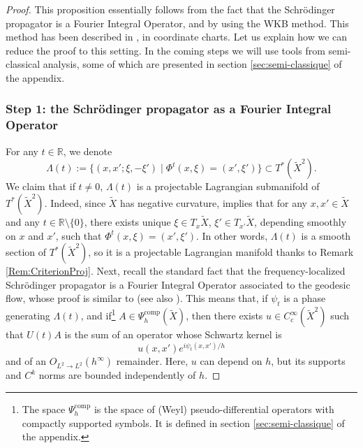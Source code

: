 \documentclass[10pt]{amsart}
\let\sep\mid
\newcommand{\rc}{\mathrm{c}}
\newcommand{\comp}{\mathrm{comp}}
\theoremstyle{plain}
\theoremstyle{definition}
\newcommand{\R}{\mathbb{R}}
\begin{document}
\begin{proof}
This proposition essentially follows from the fact that the Schrödinger propagator is a Fourier Integral Operator, and by using the WKB method. This method has been described in \cite[Lem.\,4.1]{NZ}, in coordinate charts. Let us explain how we can reduce the proof to this setting. In the coming steps we will use tools from semi-classical analysis, some of which are presented in section \ref{sec:semi-classique} of the appendix.

\subsubsection*{Step 1: the Schrödinger propagator as a Fourier Integral Operator}
For any $t\in \R$, we denote
\[
\Lambda(t):= \{(x,x'; \xi, -\xi')\sep \Phi^t(x,\xi)= (x', \xi')\} \subset T^*(\widetilde{X}^2).
\]
We claim that if $t\neq 0$, $\Lambda(t)$ is a projectable Lagrangian submanifold of $T^*(\widetilde{X}^2)$. Indeed, since $\widetilde{X}$ has negative curvature, \cite[Th.\,4.8.1]{Jost} implies that for any $x,x'\in \widetilde{X}$ and any $t\in \R\setminus\{0\}$, there exists unique $\xi\in T_x\widetilde{X}$, $\xi'\in T_{x'}\widetilde{X}$, depending smoothly on $x$ and $x'$, such that $\Phi^t(x,\xi)= (x', \xi')$. In other words, $\Lambda(t)$ is a smooth section of $T^*(\widetilde{X}^2)$, so it is a projectable Lagrangian manifold thanks to Remark \ref{Rem:CriterionProj}. Next, recall the standard fact that the frequency-localized Schrödinger propagator is a Fourier Integral Operator associated to the geodesic flow, whose proof is similar to \cite[Th.\,2.1]{LapSig} (see also \cite[Th.\,10.4]{Zworski_2012}). This means that, if $\psi_t$ is a phase generating $\Lambda(t)$, and if\footnote{The space $\Psi_h^{\comp}$ is the space of (Weyl) pseudo-differential operators with compactly supported symbols. It is defined in section \ref{sec:semi-classique} of the appendix.} $A\in \Psi_h^{\comp}(\widetilde{X})$, then there exists $u\in C_\rc^\infty(\widetilde{X}^2)$ such that $U(t)A$ is the sum of an operator whose Schwartz kernel is
\[
u(x,x') e^{i\psi_t(x,x')/h}
\]
and of an $O_{L^2\to L^2}(h^\infty)$ remainder. Here, $u$ can depend on $h$, but its supports and $C^k$ norms are bounded independently of $h$.


\end{proof}
\end{document}
